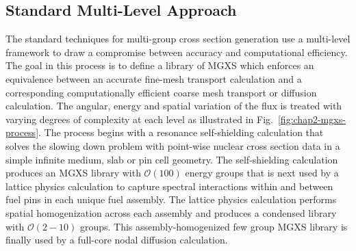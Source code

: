 

\subsection{Standard Multi-Level Approach}
\label{subsec:chap2-mgxs-lib-std-approach}

The standard techniques for multi-group cross section generation use a multi-level framework to draw a compromise between accuracy and computational efficiency. The goal in this process is to define a library of \ac{MGXS} which enforces an equivalence between an accurate fine-mesh transport calculation and a corresponding computationally efficient coarse mesh transport or diffusion calculation. The angular, energy and spatial variation of the flux is treated with varying degrees of complexity at each level as illustrated in Fig.~\ref{fig:chap2-mgxs-process}. The process begins with a resonance self-shielding calculation that solves the slowing down problem with point-wise nuclear cross section data in a simple infinite medium, slab or pin cell geometry. The self-shielding calculation produces an \ac{MGXS} library with $\mathcal{O}(100)$ energy groups that is next used by a lattice physics calculation to capture spectral interactions within and between fuel pins in each unique fuel assembly. The lattice physics calculation performs spatial homogenization across each assembly and produces a condensed library with $\mathcal{O}(2-10)$ groups. This assembly-homogenized few group \ac{MGXS} library is finally used by a full-core nodal diffusion calculation.


